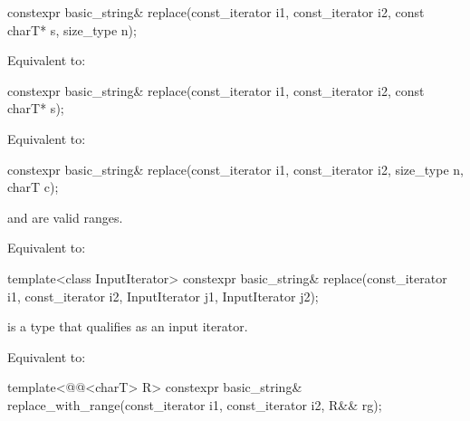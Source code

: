 %
\begin{itemdecl}
constexpr basic_string& replace(const_iterator i1, const_iterator i2, const charT* s, size_type n);
\end{itemdecl}

\begin{itemdescr}
\pnum
\effects
Equivalent to: 
\end{itemdescr}

%
\begin{itemdecl}
constexpr basic_string& replace(const_iterator i1, const_iterator i2, const charT* s);
\end{itemdecl}

\begin{itemdescr}
\pnum
\effects
Equivalent to: 
\end{itemdescr}

%
\begin{itemdecl}
constexpr basic_string& replace(const_iterator i1, const_iterator i2, size_type n, charT c);
\end{itemdecl}

\begin{itemdescr}
\pnum
\expects
{} and  are valid ranges.

\pnum
\effects
Equivalent to: 
\end{itemdescr}

%
\begin{itemdecl}
template<class InputIterator>
  constexpr basic_string& replace(const_iterator i1, const_iterator i2,
                                  InputIterator j1, InputIterator j2);
\end{itemdecl}

\begin{itemdescr}
\pnum
\constraints
{} is a type that qualifies as an input
iterator.

\pnum
\effects
Equivalent to: 
\end{itemdescr}

%
\begin{itemdecl}
template<@@<charT> R>
  constexpr basic_string& replace_with_range(const_iterator i1, const_iterator i2, R&& rg);
\end{itemdecl}


